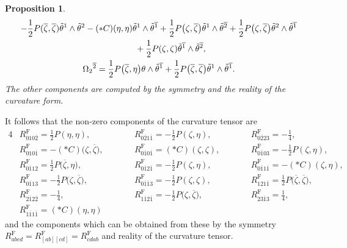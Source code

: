 \documentclass[pdftex]{sigma}
\newcommand\ol{\overline}
\numberwithin{equation}{section}
\newtheorem{Proposition}[Theorem]{Proposition}
 { \theoremstyle{definition}
\newtheorem{Definition}[Theorem]{Definition}
\newtheorem*{Notation}{Notation}
\newtheorem{Example}[Theorem]{Example}
\newtheorem{Remark}[Theorem]{Remark} }
\begin{document}
\begin{Proposition}
\begin{gather*}
 -\frac{1}{2}P(\ol\zeta ,\ol\zeta)\tilde\theta^1\wedge\tilde\theta^2
-(*C)(\eta, \eta)\tilde\theta^1\wedge\tilde\theta^{\ol1}
+\frac{1}{2}
P\bigl(\zeta, \ol\zeta\bigr)\tilde\theta^1\wedge\tilde\theta^{\ol2}
+\frac{1}{2}P\bigl(\zeta, \ol\zeta\bigr)\tilde\theta^2\wedge\tilde\theta^{\ol1} \\
\hphantom{\Omega_1{}^2=}{}\hspace{0.2mm}
+\frac{1}{2}P(\zeta, \zeta)\tilde\theta^{\ol1}\wedge\tilde\theta^{\ol2}, \\
\Omega_2{}^{\ol2}=\frac{1}{2}P\bigl(\ol\zeta, \eta\bigr)\theta\wedge\tilde\theta^{\ol1}+\frac{1}{2}P\bigl(\ol\zeta, \ol\zeta\bigr)\tilde\theta^1\wedge\tilde\theta^{\ol1}.
\end{gather*}
The other components are computed by the symmetry and the reality of the curvature form.
\end{Proposition}
It follows that the non-zero components of the curvature tensor are
\begin{alignat*}{4}
&R^{\mathrm{F}}_{010\ol2}=\frac{1}{2}P(\eta, \eta),
\qquad&&
R^{\mathrm{F}}_{0\ol21\ol1}=-\frac{1}{2}P(\zeta, \eta),
\qquad&&
R^{\mathrm{F}}_{0\ol223}=-\frac{1}{4},& \\
&R^{\mathrm{F}}_{010\ol1}=-(*C)\bigl(\zeta, \ol\zeta\bigr),
\qquad&&
R^{\mathrm{F}}_{0\ol10\ol1}=(*C)(\zeta, \zeta),
\qquad&&
R^{\mathrm{F}}_{0\ol103}=-\frac{1}{2}P(\zeta, \eta),& \\
&R^{\mathrm{F}}_{0\ol112}=\frac{1}{2}P\bigl(\ol\zeta, \eta\bigr),
\qquad&&
R^{\mathrm{F}}_{0\ol12\ol1}=-\frac{1}{2}P(\zeta, \eta),
\qquad&&
R^{\mathrm{F}}_{0\ol11\ol1}=-(*C)(\zeta, \eta),& \\
&R^{\mathrm{F}}_{0\ol113}=-\frac{1}{2}P\bigl(\zeta, \ol\zeta\bigr),
\qquad&&
R^{\mathrm{F}}_{0\ol1\ol13}=-\frac{1}{2}P(\zeta, \zeta),
\qquad&&
R^{\mathrm{F}}_{121\ol1}=\frac{1}{2}P\bigl(\ol\zeta, \ol\zeta\bigr),& \\
&R^{\mathrm{F}}_{2\ol12\ol2}=-\frac{1}{4},
\qquad&&
R^{\mathrm{F}}_{1\ol12\ol1}=-\frac{1}{2}P\bigl(\zeta, \ol\zeta\bigr),
\qquad&&
R^{\mathrm{F}}_{23\ol13}=\frac{1}{4},& \\
&R^{\mathrm{F}}_{1\ol11\ol1}=(*C)(\eta, \eta)&
\end{alignat*}
and the components which can be obtained from these by the symmetry
$R^{\mathrm{F}}_{abcd}=R^{\mathrm{F}}_{[ab][cd]}=R^{\mathrm{F}}_{cdab}$ and reality of the curvature tensor.
\end{document}
